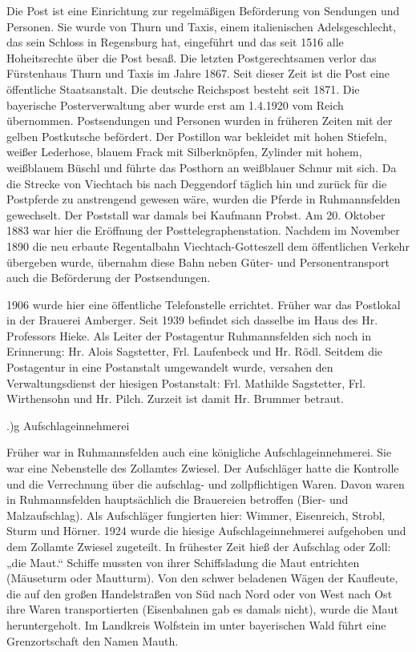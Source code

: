 Die Post ist eine Einrichtung zur regelmäßigen Beförderung von Sendungen und
Personen. Sie wurde von Thurn und Taxis, einem italienischen Adelsgeschlecht,
das sein Schloss in Regensburg hat, eingeführt und das seit 1516 alle
Hoheitsrechte über die Post besaß. Die letzten Postgerechtsamen verlor das
Fürstenhaus Thurn und Taxis im Jahre 1867. Seit dieser Zeit ist die Post eine
öffentliche Staatsanstalt. Die deutsche Reichspost besteht seit 1871. Die
bayerische Posterverwaltung aber wurde erst am 1.4.1920 vom Reich übernommen.
Postsendungen und Personen wurden in früheren Zeiten mit der gelben Postkutsche
befördert. Der Postillon war bekleidet mit hohen Stiefeln, weißer Lederhose,
blauem Frack mit Silberknöpfen, Zylinder mit hohem, weißblauem Büschl und führte
das Posthorn an weißblauer Schnur mit sich. Da die Strecke von Viechtach bis
nach Deggendorf täglich hin und zurück für die Postpferde zu anstrengend gewesen
wäre, wurden die Pferde in Ruhmannsfelden gewechselt. Der Poststall war damals
bei Kaufmann Probst. Am 20. Oktober 1883 war hier die Eröffnung der
Posttelegraphenstation. Nachdem im November 1890 die neu erbaute Regentalbahn
Viechtach-Gotteszell dem öffentlichen Verkehr übergeben wurde, übernahm diese
Bahn neben Güter- und Personentransport auch die Beförderung der Postsendungen.

1906 wurde hier eine öffentliche Telefonstelle errichtet. Früher war das
Postlokal in der Brauerei Amberger. Seit 1939 befindet sich dasselbe im Haus des
Hr. Professors Hieke. Als Leiter der Postagentur Ruhmannsfelden sich noch in
Erinnerung: Hr. Alois Sagstetter, Frl. Laufenbeck und Hr. Rödl. Seitdem die
Postagentur in eine Postanstalt umgewandelt wurde, versahen den
Verwaltungsdienst der hiesigen Postanstalt: Frl. Mathilde Sagstetter, Frl.
Wirthensohn und Hr. Pilch. Zurzeit ist damit Hr. Brummer betraut.

.)g Aufschlageinnehmerei

Früher war in Ruhmannsfelden auch eine königliche Aufschlageinnehmerei. Sie war
eine Nebenstelle des Zollamtes Zwiesel. Der Aufschläger hatte die Kontrolle und
die Verrechnung über die aufschlag- und zollpflichtigen Waren. Davon waren in
Ruhmannsfelden hauptsächlich die Brauereien betroffen (Bier- und Malzaufschlag).
Als Aufschläger fungierten hier: Wimmer, Eisenreich, Strobl, Sturm und Hörner.
1924 wurde die hiesige Aufschlageinnehmerei aufgehoben und dem Zollamte Zwiesel
zugeteilt. In frühester Zeit hieß der Aufschlag oder Zoll: „die Maut.“ Schiffe
mussten von ihrer Schiffsladung die Maut entrichten (Mäuseturm oder Mautturm).
Von den schwer beladenen Wägen der Kaufleute, die auf den großen Handelstraßen
von Süd nach Nord oder von West nach Ost ihre Waren transportierten (Eisenbahnen
gab es damals nicht), wurde die Maut heruntergeholt. Im Landkreis Wolfstein im
unter bayerischen Wald führt eine Grenzortschaft den Namen Mauth.

